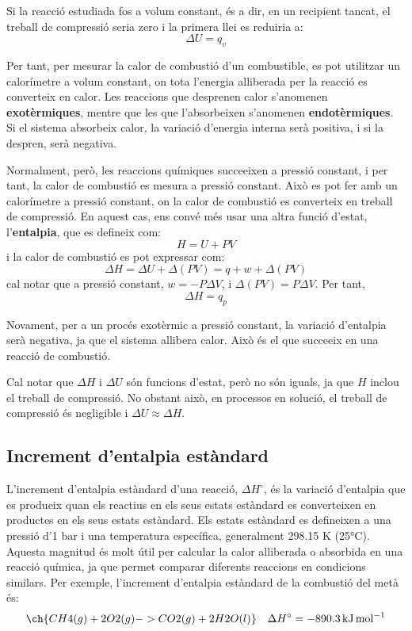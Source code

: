 Si la reacció estudiada fos a volum constant, és a dir, en un recipient tancat, el treball de compressió seria zero i la primera llei es reduiria a:
\begin{equation}
    \Delta U = q_v
\end{equation}

Per tant, per mesurar la calor de combustió d'un combustible, es pot utilitzar un calorímetre a volum constant, on tota l'energia alliberada per la reacció es converteix en calor. Les reaccions que desprenen calor s'anomenen \textbf{exotèrmiques}, mentre que les que l'absorbeixen s'anomenen \textbf{endotèrmiques}. Si el sistema absorbeix calor, la variació d'energia interna serà positiva, i si la despren, serà negativa.

Normalment, però, les reaccions químiques succeeixen a pressió constant, i per tant, la calor de combustió es mesura a pressió constant. Això es pot fer amb un calorímetre a pressió constant, on la calor de combustió es converteix en treball de compressió. En aquest cas, ens convé més usar una altra funció d'estat, l'{\bf entalpia}, que es defineix com:
\begin{equation}
    H = U + PV
\end{equation}
i la calor de combustió es pot expressar com:
\begin{equation}
    \Delta H = \Delta U + \Delta (PV) = q+ w + \Delta (PV) \end{equation}
    cal notar que a pressió constant, $w = -P \Delta V$, i $\Delta (PV)=P\Delta V$. Per tant,
    \begin{equation}
    \Delta H = q_p
\end{equation}

Novament, per a un procés exotèrmic a pressió constant, la variació d'entalpia serà negativa, ja que el sistema allibera calor. Això és el que succeeix en una reacció de combustió.

Cal notar que $\Delta H$ i $\Delta U$ són funcions d'estat, però no són iguals, ja que $H$ inclou el treball de compressió. No obstant això, en processos en solució, el treball de compressió és negligible i $\Delta U \approx \Delta H$.

\subsection{Increment d'entalpia estàndard}

L'increment d'entalpia estàndard d'una reacció, $\Delta H^\circ$, és la variació d'entalpia que es produeix quan els reactius en els seus estats estàndard es converteixen en productes en els seus estats estàndard. Els estats estàndard es defineixen a una pressió d'1 bar i una temperatura específica, generalment 298.15 K (25°C). Aquesta magnitud és molt útil per calcular la calor alliberada o absorbida en una reacció química, ja que permet comparar diferents reaccions en condicions similars. Per exemple, l'increment d'entalpia estàndard de la combustió del metà és:
\begin{equation}
\ch{CH4(g) + 2 O2(g) -> CO2(g) + 2 H2O(l)} \quad \Delta H^\circ = -890.3 \, \si{\kilo\joule\per\mole}
\end{equation} 

